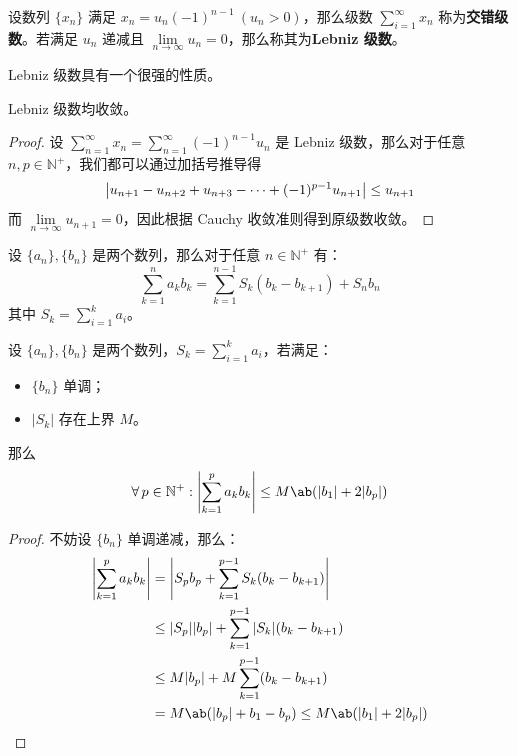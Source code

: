 \begin{definition}[交错级数]
    设数列 $\{x_n\}$ 满足 $x_n = u_n (-1)^{n - 1}\ (u_n > 0)$，那么级数 $\sum_{i = 1}^{\infty} x_n$ 称为\textbf{交错级数}。若满足 $u_n$ 递减且 $\lim\limits_{n \to \infty} u_n = 0$，那么称其为\textbf{Lebniz 级数}。 
\end{definition}

Lebniz 级数具有一个很强的性质。

\begin{theorem}
    Lebniz 级数均收敛。

    \begin{proof}
        设 $\sum\limits_{n = 1}^{\infty} x_n = \sum\limits_{n = 1}^{\infty} (-1)^{n - 1} u_n$ 是 Lebniz 级数，那么对于任意 $n, p \in \mathbb{N}^{+}$，我们都可以通过加括号推导得
        $$
        \abs{u_{n + 1} - u_{n + 2} + u_{n + 3} - \cdots + (-1)^{p - 1} u_{n + 1}} \le u_{n + 1}
        $$
        而 $\lim\limits_{n \to \infty} u_{n + 1} = 0$，因此根据 Cauchy 收敛准则得到原级数收敛。
    \end{proof}
\end{theorem}

\begin{lemma}[分部求和]
    设 $\{a_n\}, \{b_n\}$ 是两个数列，那么对于任意 $n \in \mathbb{N}^+$ 有：
    $$
    \sum_{k = 1}^{n} a_k b_k = \sum_{k = 1}^{n - 1} S_k (b_k - b_{k + 1}) + S_n b_n
    $$
    其中 $S_k = \sum\limits_{i = 1}^{k} a_i$。
\end{lemma}

\begin{lemma}[Abel 引理]
    设 $\{a_n\}, \{b_n\}$ 是两个数列，$S_k = \sum\limits_{i = 1}^{k} a_i$，若满足：
    \begin{itemize}
        \item $\{b_n\}$ 单调；
        \item $|S_k|$ 存在上界 $M$。
    \end{itemize}
    那么
    $$
    \forall\,p \in \mathbb{N}^+: \abs{\sum_{k = 1}^{p} a_k b_k} \le M\ab(\abs{b_1} + 2 \abs{b_p})
    $$
    \begin{proof}
        不妨设 $\{b_n\}$ 单调递减，那么：
        $$
        \begin{aligned}
            \abs{\sum_{k = 1}^{p} a_k b_k} & = \abs{S_p b_p + \sum_{k = 1}^{p - 1} S_k (b_k - b_{k + 1})} \\
            & \le \abs{S_p} \abs{b_p} + \sum_{k = 1}^{p - 1} \abs{S_k} (b_k - b_{k + 1}) \\
            & \le M \abs{b_p} + M \sum_{k = 1}^{p - 1} (b_k - b_{k + 1}) \\
            & = M\ab(\abs{b_p} + b_1 - b_p) \le M \ab(\abs{b_1} + 2 \abs{b_p})
        \end{aligned}
        $$
    \end{proof}
\end{lemma}

